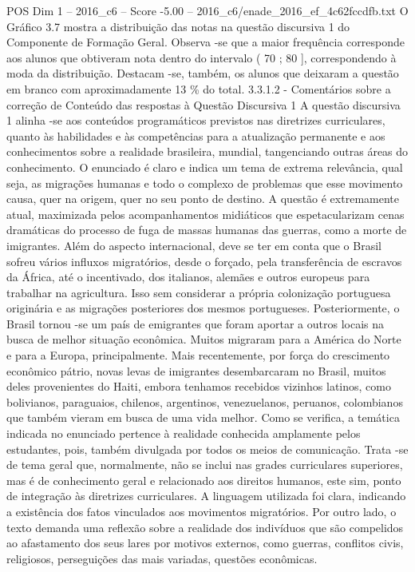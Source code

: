 \begin{textsample}{POS Dim 1 – 2016\_c6 – Score -5.00 – 2016\_c6/enade\_2016\_ef\_4c62fccdfb.txt}
O Gráfico 3.7 mostra a distribuição das notas na questão discursiva 1 do Componente de Formação Geral.
Observa -se que a maior frequência corresponde aos alunos que obtiveram nota dentro do intervalo ( 70 ; 80 ], correspondendo à moda da distribuição.
Destacam -se, também, os alunos que deixaram a questão em branco com aproximadamente 13 \% do total. 3.3.1.2 - Comentários sobre a correção de Conteúdo das respostas à Questão Discursiva 1 A questão discursiva 1 alinha -se aos conteúdos programáticos previstos nas diretrizes curriculares, quanto às habilidades e às competências para a atualização permanente e aos conhecimentos sobre a realidade brasileira, mundial, tangenciando outras áreas do conhecimento.
O enunciado é claro e indica um tema de extrema relevância, qual seja, as migrações humanas e todo o complexo de problemas que esse movimento causa, quer na origem, quer no seu ponto de destino.
A questão é extremamente atual, maximizada pelos acompanhamentos midiáticos que espetacularizam cenas dramáticas do processo de fuga de massas humanas das guerras, como a morte de imigrantes.
Além do aspecto internacional, deve se ter em conta que o Brasil sofreu vários influxos migratórios, desde o forçado, pela transferência de escravos da África, até o incentivado, dos italianos, alemães e outros europeus para trabalhar na agricultura.
Isso sem considerar a própria colonização portuguesa originária e as migrações posteriores dos mesmos portugueses.
Posteriormente, o Brasil tornou -se um país de emigrantes que foram aportar a outros locais na busca de melhor situação econômica.
Muitos migraram para a América do Norte e para a Europa, principalmente.
Mais recentemente, por força do crescimento econômico pátrio, novas levas de imigrantes desembarcaram no Brasil, muitos deles provenientes do Haiti, embora tenhamos recebidos vizinhos latinos, como bolivianos, paraguaios, chilenos, argentinos, venezuelanos, peruanos, colombianos que também vieram em busca de uma vida melhor.
Como se verifica, a temática indicada no enunciado pertence à realidade conhecida amplamente pelos estudantes, pois, também divulgada por todos os meios de comunicação.
Trata -se de tema geral que, normalmente, não se inclui nas grades curriculares superiores, mas é de conhecimento geral e relacionado aos direitos humanos, este sim, ponto de integração às diretrizes curriculares.
A linguagem utilizada foi clara, indicando a existência dos fatos vinculados aos movimentos migratórios.
Por outro lado, o texto demanda uma reflexão sobre a realidade dos indivíduos que são compelidos ao afastamento dos seus lares por motivos externos, como guerras, conflitos civis, religiosos, perseguições das mais variadas, questões econômicas.

\end{textsample}
